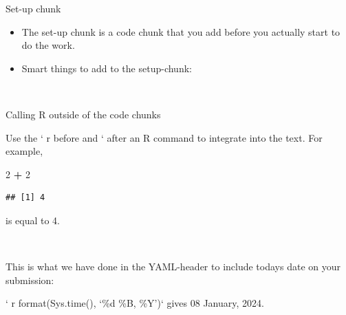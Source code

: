 \documentclass[
  10pt,
  ignorenonframetext,
]{beamer}
\newenvironment{Shaded}{\begin{snugshade}}{\end{snugshade}}
\newcommand{\AttributeTok}[1]{\textcolor[rgb]{0.13,0.29,0.53}{#1}}
\newcommand{\ConstantTok}[1]{\textcolor[rgb]{0.56,0.35,0.01}{#1}}
\newcommand{\DecValTok}[1]{\textcolor[rgb]{0.00,0.00,0.81}{#1}}
\newcommand{\FunctionTok}[1]{\textcolor[rgb]{0.13,0.29,0.53}{\textbf{#1}}}
\newcommand{\NormalTok}[1]{#1}
\newcommand{\SpecialCharTok}[1]{\textcolor[rgb]{0.81,0.36,0.00}{\textbf{#1}}}
\newcommand{\StringTok}[1]{\textcolor[rgb]{0.31,0.60,0.02}{#1}}
\providecommand{\tightlist}{%
  \setlength{\itemsep}{0pt}\setlength{\parskip}{0pt}}
\begin{document}
\begin{frame}[fragile]
\begin{block}{Set-up chunk}
\protect\hypertarget{set-up-chunk}{}
\(~\)

\begin{itemize}
\tightlist
\item
  The set-up chunk is a code chunk that you add before you actually
  start to do the work.
\end{itemize}

\vspace{2mm}

\begin{itemize}
\tightlist
\item
  Smart things to add to the setup-chunk:
\end{itemize}

\(~\)

\scriptsize

\begin{Shaded}
\end{Shaded}
\end{block}
\end{frame}

\begin{frame}[fragile]
\begin{block}{Calling R outside of the code chunks}
\protect\hypertarget{calling-r-outside-of-the-code-chunks}{}
\(~\)

Use the ` r before and ` after an R command to integrate into the text.
For example,

\begin{Shaded}
\begin{Highlighting}[]
\DecValTok{2} \SpecialCharTok{+} \DecValTok{2}
\end{Highlighting}
\end{Shaded}

\begin{verbatim}
## [1] 4
\end{verbatim}

is equal to 4.

\(~\)

This is what we have done in the YAML-header to include todays date on
your submission:

` r format(Sys.time(), `\%d \%B, \%Y')` gives 08 January, 2024.
\end{block}
\end{frame}
\end{document}
